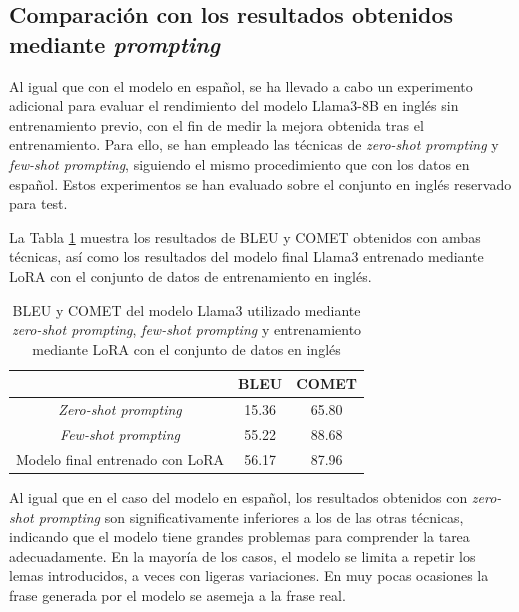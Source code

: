 \documentclass[11pt,spanish,listoffigures,listoftables]{tfgetsinf}
\begin{document}
\subsection{Comparación con los resultados obtenidos mediante \textit{prompting}}

Al igual que con el modelo en español, se ha llevado a cabo un experimento adicional para evaluar el rendimiento del modelo Llama3-8B en inglés sin entrenamiento previo, con el fin de medir la mejora obtenida tras el entrenamiento. Para ello, se han empleado las técnicas de \textit{zero-shot prompting} y \textit{few-shot prompting}, siguiendo el mismo procedimiento que con los datos en español. Estos experimentos se han evaluado sobre el conjunto en inglés reservado para test.

La Tabla \ref{tab:promptingInglés} muestra los resultados de BLEU y COMET obtenidos con ambas técnicas, así como los resultados del modelo final Llama3 entrenado mediante LoRA con el conjunto de datos de entrenamiento en inglés.

\begin{table}[!h]
\caption{BLEU y COMET del modelo Llama3 utilizado mediante \textit{zero-shot prompting}, \textit{few-shot prompting} y entrenamiento mediante LoRA con el conjunto de datos en inglés}
\begin{center}
\begin{tabular}{ c | c c }
	\ & BLEU & COMET \\
	\hline
	\hline
	\textit{Zero-shot prompting} & 15.36 & 65.80  \\
	\textit{Few-shot prompting} & 55.22 & 88.68 \\
	Modelo final entrenado con LoRA & 56.17 & 87.96 \\

\end{tabular}
\end{center}
\label{tab:promptingInglés}
\end{table}

Al igual que en el caso del modelo en español, los resultados obtenidos con \textit{zero-shot prompting} son significativamente inferiores a los de las otras técnicas, indicando que el modelo tiene grandes problemas para comprender la tarea adecuadamente. En la mayoría de los casos, el modelo se limita a repetir los lemas introducidos, a veces con ligeras variaciones. En muy pocas ocasiones la frase generada por el modelo se asemeja a la frase real.
\end{document}
